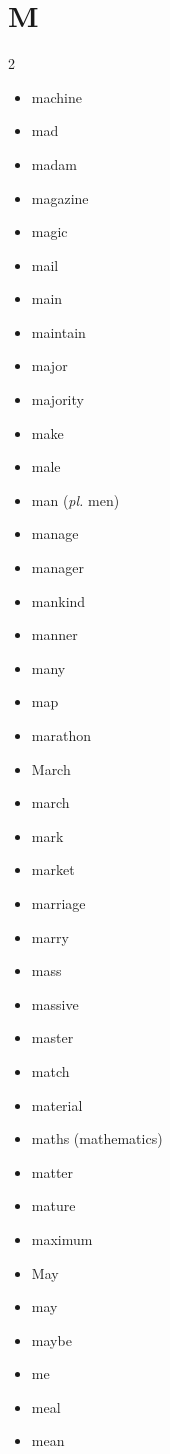 \documentclass[../../book.tex]{subfiles}
\begin{document}
\section{M}
\raggedcolumns
\begin{multicols}{2}
\begin{itemize}
\item[-] machine
\item[-] mad
\item[-] madam
\item[-] magazine
\item[-] magic
\item[-] mail
\item[-] main
\item[-] maintain
\item[-] major
\item[-] majority
\item[-] make
\item[-] male
\item[-] man (\emph{pl.} men)
\item[-] manage
\item[-] manager
\item[-] mankind
\item[-] manner
\item[-] many
\item[-] map
\item[-] marathon
\item[-] March
\item[-] march
\item[-] mark
\item[-] market
\item[-] marriage
\item[-] marry
\item[-] mass
\item[-] massive
\item[-] master
\item[-] match
\item[-] material
\item[-] maths (mathematics)
\item[-] matter
\item[-] mature
\item[-] maximum
\item[-] May
\item[-] may
\item[-] maybe
\item[-] me
\item[-] meal
\item[-] mean

\end{itemize}
\end{multicols}
\end{document}
